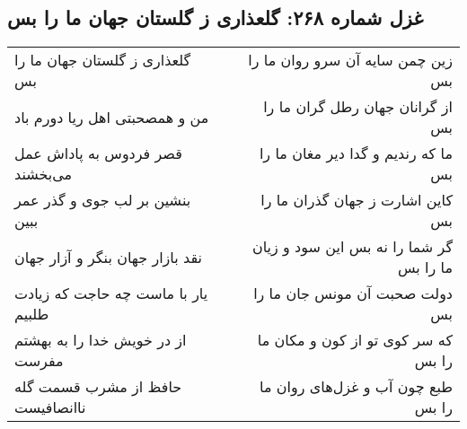\begin{center}
\section*{غزل شماره ۲۶۸: گلعذاری ز گلستان جهان ما را بس}
\label{sec:sh268}
\begin{longtable}{l p{0.5cm} r}
گلعذاری ز گلستان جهان ما را بس
&&
زین چمن سایه آن سرو روان ما را بس
\\
من و همصحبتی اهل ریا دورم باد
&&
از گرانان جهان رطل گران ما را بس
\\
قصر فردوس به پاداش عمل می‌بخشند
&&
ما که رندیم و گدا دیر مغان ما را بس
\\
بنشین بر لب جوی و گذر عمر ببین
&&
کاین اشارت ز جهان گذران ما را بس
\\
نقد بازار جهان بنگر و آزار جهان
&&
گر شما را نه بس این سود و زیان ما را بس
\\
یار با ماست چه حاجت که زیادت طلبیم
&&
دولت صحبت آن مونس جان ما را بس
\\
از در خویش خدا را به بهشتم مفرست
&&
که سر کوی تو از کون و مکان ما را بس
\\
حافظ از مشرب قسمت گله ناانصافیست
&&
طبع چون آب و غزل‌های روان ما را بس
\\
\end{longtable}
\end{center}
